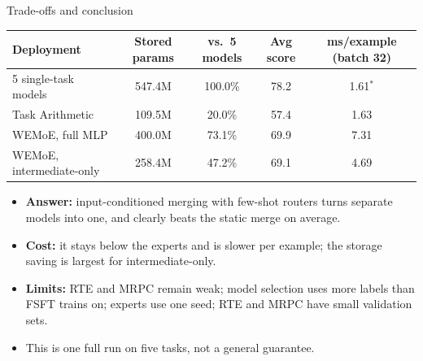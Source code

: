 \begin{frame}{Trade-offs and conclusion}
  \centering
  \footnotesize
  \renewcommand{\arraystretch}{1.3}\begin{tabular}{|l|c|c|c|c|}
    \hline
    \textbf{Deployment} & \textbf{Stored params} & \textbf{vs.\ 5 models} & \textbf{Avg score} & \textbf{ms/example (batch 32)}\\ \hline
    5 single-task models & 547.4M & 100.0\% & 78.2 & 1.61$^{*}$\\ \hline
    Task Arithmetic & 109.5M & 20.0\% & 57.4 & 1.63\\ \hline
    WEMoE, full MLP & 400.0M & 73.1\% & 69.9 & 7.31\\ \hline
    WEMoE, intermediate-only & 258.4M & 47.2\% & 69.1 & 4.69\\ \hline
  \end{tabular}
  \vfill
  \raggedright
  \begin{itemize}\footnotesize
    \item \textbf{Answer:} input-conditioned merging with few-shot routers turns separate models into one, and clearly beats the static merge on average.
    \item \textbf{Cost:} it stays below the experts and is slower per example; the storage saving is largest for intermediate-only.
    \item \textbf{Limits:} RTE and MRPC remain weak; model selection uses more labels than FSFT trains on; experts use one seed; RTE and MRPC have small validation sets.
    \item This is one full run on five tasks, not a general guarantee.
  \end{itemize}
\end{frame}
